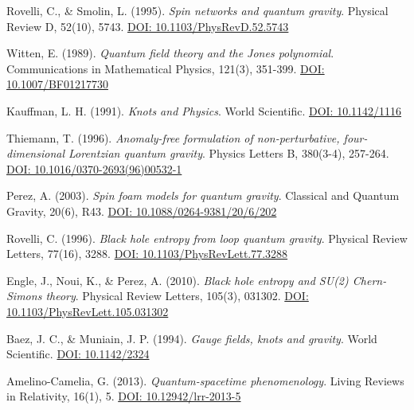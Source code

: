 \documentclass[12pt,a4paper]{article}
\begin{document}
\begin{thebibliography}{99}

Rovelli, C., \& Smolin, L. (1995).
\textit{Spin networks and quantum gravity}.
Physical Review D, 52(10), 5743.
\href{https://doi.org/10.1103/PhysRevD.52.5743}{DOI: 10.1103/PhysRevD.52.5743}

Witten, E. (1989).
\textit{Quantum field theory and the Jones polynomial}.
Communications in Mathematical Physics, 121(3), 351-399.
\href{https://doi.org/10.1007/BF01217730}{DOI: 10.1007/BF01217730}

Kauffman, L. H. (1991).
\textit{Knots and Physics}.
World Scientific.
\href{https://doi.org/10.1142/1116}{DOI: 10.1142/1116}

Thiemann, T. (1996).
\textit{Anomaly-free formulation of non-perturbative, four-dimensional Lorentzian quantum gravity}.
Physics Letters B, 380(3-4), 257-264.
\href{https://doi.org/10.1016/0370-2693(96)00532-1}{DOI: 10.1016/0370-2693(96)00532-1}

Perez, A. (2003).
\textit{Spin foam models for quantum gravity}.
Classical and Quantum Gravity, 20(6), R43.
\href{https://doi.org/10.1088/0264-9381/20/6/202}{DOI: 10.1088/0264-9381/20/6/202}

Rovelli, C. (1996).
\textit{Black hole entropy from loop quantum gravity}.
Physical Review Letters, 77(16), 3288.
\href{https://doi.org/10.1103/PhysRevLett.77.3288}{DOI: 10.1103/PhysRevLett.77.3288}

Engle, J., Noui, K., \& Perez, A. (2010).
\textit{Black hole entropy and SU(2) Chern-Simons theory}.
Physical Review Letters, 105(3), 031302.
\href{https://doi.org/10.1103/PhysRevLett.105.031302}{DOI: 10.1103/PhysRevLett.105.031302}

Baez, J. C., \& Muniain, J. P. (1994).
\textit{Gauge fields, knots and gravity}.
World Scientific.
\href{https://doi.org/10.1142/2324}{DOI: 10.1142/2324}

Amelino-Camelia, G. (2013).
\textit{Quantum-spacetime phenomenology}.
Living Reviews in Relativity, 16(1), 5.
\href{https://doi.org/10.12942/lrr-2013-5}{DOI: 10.12942/lrr-2013-5}

\end{thebibliography}
\end{document}
